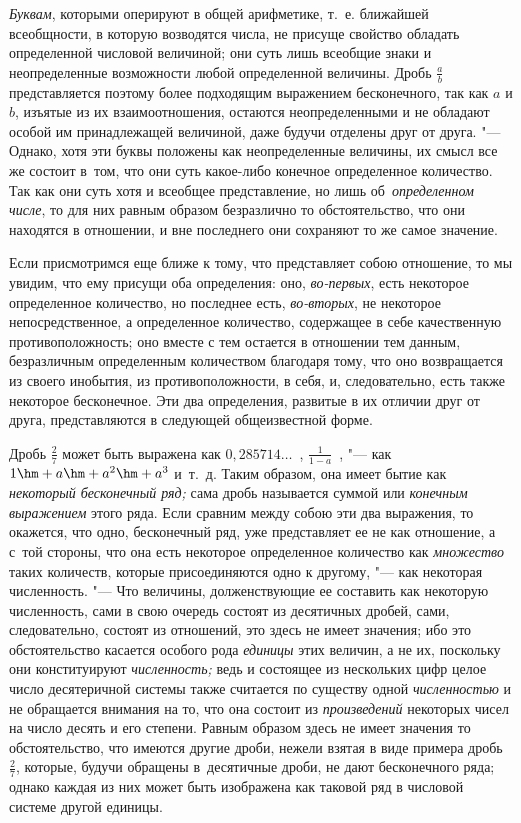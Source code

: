 {\em Буквам}, которыми оперируют в общей арифметике, т.~е. ближайшей
всеобщности, в которую возводятся числа, не присуще свойство обладать
определенной числовой величиной; они суть лишь всеобщие знаки и неопределенные
возможности любой определенной величины. Дробь $\frac a b$ представляется
поэтому более подходящим выражением бесконечного, так как $a$ и $b$,
изъятые из их взаимоотношения, остаются неопределенными и не обладают особой им
принадлежащей величиной, даже будучи отделены друг от друга. "--- Однако, хотя
эти буквы положены как неопределенные величины, их смысл все же состоит в~том,
что они суть какое-либо конечное определенное количество. Так как они суть хотя
и всеобщее представление, но лишь об~{\em определенном числе}, то для них
равным образом безразлично то обстоятельство, что они находятся в отношении,
и вне последнего они сохраняют то же самое значение.

Если присмотримся еще ближе к тому, что представляет собою отношение, то мы
увидим, что ему присущи оба определения: оно, {\em во-первых}, есть некоторое
определенное количество, но последнее есть, {\em во-вторых}, не некоторое
непосредственное, а определенное количество, содержащее в себе качественную
противоположность; оно вместе с тем остается в отношении тем данным,
безразличным определенным количеством благодаря тому, что оно возвращается из
своего инобытия, из противоположности, в себя, и, следовательно, есть также
некоторое бесконечное. Эти два определения, развитые в их отличии друг от
друга, представляются в следующей общеизвестной форме.

Дробь $\frac 2 7$ может быть выражена как $0{,}285714\ldots$~,
$\frac 1{1-a}$~, "--- как $1\hm+a\hm+a^2\hm+a^3$ и~т.~д. Таким образом, она
имеет бытие как {\em некоторый бесконечный ряд;} сама дробь называется суммой
или {\em конечным выражением} этого ряда. Если сравним между собою эти два
выражения, то окажется, что одно, бесконечный ряд, уже представляет ее не как
отношение, а с~той стороны, что она есть некоторое определенное количество как
{\em множество} таких количеств, которые присоединяются одно к другому, "---
как некоторая численность. "--- Что величины, долженствующие ее составить как
некоторую численность, сами в свою очередь состоят из десятичных дробей, сами,
следовательно, состоят из отношений, это здесь не имеет значения; ибо это
обстоятельство касается особого рода {\em единицы} этих величин, а не их,
поскольку они конституируют {\em численность;} ведь и состоящее из нескольких
цифр целое число десятеричной системы также считается по существу одной
{\em численностью} и не обращается внимания на то, что она состоит из
{\em произведений} некоторых чисел на число десять и его степени. Равным
образом здесь не имеет значения то обстоятельство, что имеются другие дроби,
нежели взятая в виде примера дробь $\frac 2 7$, которые, будучи обращены
в~десятичные дроби, не дают бесконечного ряда; однако каждая из них может быть
изображена как таковой ряд в числовой системе другой единицы.

